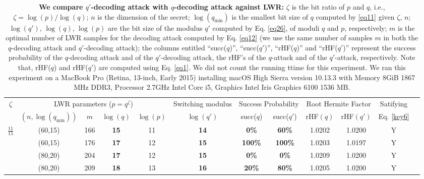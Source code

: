 \documentclass{cta-author}
\begin{document}
\begin{table}[t]
	\caption{ \textbf{We compare $q'$-decoding attack with $q$-decoding attack against LWR:} $\zeta$ is the bit ratio of $p$ and $q$, i.e., $\zeta=\log (p)/ \log (q)$; $n$ is the dimension of the secret; $\log (q_{\text{min}})$ is the smallest bit size of $q$ computed by \eqref{eq11} given $\zeta$, $n$; $\log (q')$, $\log (q)$, $\log(p)$ are the bit size of the modulus $q'$ computed by Eq. \eqref{eq26}, of moduli $q$ and $p$, respectively; $m$ is the optimal number of LWR samples for the decoding  attack computed by Eq. \eqref{eq12} (we use the same number of samples $m$ in both the $q$-decoding attack and $q'$-decoding attack); the columns entitled ``succ($q$)'', ``succ($q'$)'',  ``rHF($q$)'' and ``rHF($q'$)'' represent the success probability of the $q$-decoding attack and of the $q'$-decoding attack, the rHF's of the $q$-attack and of the $q'$-attack, respectively. Note that, rHF($q$) and rHF($q'$) are computed using Eq. \eqref{eq1}. We did not count the running ttime for this experiment.  We ran this experiment on a MacBook Pro (Retina, 13-inch, Early 2015) installing macOS High Sierra version 10.13.3 with Memory 8GiB 1867 MHz DDR3, Processor 2.7GHz Intel Core i5, Graphics Intel Iris Graphics 6100 1536 MB.} 
	\centering
	\small\addtolength{\tabcolsep}{0pt}
	
	\begin{tabular}{| c|| c|c | c | c | c | c | c |c|c| c| c|}	
		\hline
		\hline
		\multirow{2}{*}{$\zeta$}&\multicolumn{4}{c|}{LWR parameters ($p=q^{\zeta}$)}& Switching modulus&\multicolumn{2}{c|}{Success Probability}&\multicolumn{2}{c|}{Root Hermite Factor}&Satifying\\
		&$(n, \log (q_{\text{min}}))$& $\  m\ $& $\log (q)$ & $\log (p)$  & $\log (q')$ & succ($q$) & succ($q'$)&rHF$(q)$&rHF$(q')$&Eq. \eqref{key6}\\
		\hline
		\hline
		
		\multirow{8}{*}{$\frac{11}{15}$}&(60,15)&166&\textbf{15}&11&\textbf{14}&\textbf{0\%}&\textbf{60\%}&1.0202&1.0200&Y\\
		
		&(60,15) &176&\textbf{17}&12&\textbf{15}&\textbf{100\%}&\textbf{100\%}&1.0203&1.0197&Y\\
		
		&	(80,20)&204&\textbf{17}&12&\textbf{15}&\textbf{0\%}&\textbf{0\%}&1.0209&1.0200&Y\\
		
		&(80,20)&209&\textbf{18}&13&\textbf{16}&\textbf{20\%}&\textbf{80\%}&1.0205&1.0200&Y\\
		

\end{tabular}
\end{table}
\end{document}
